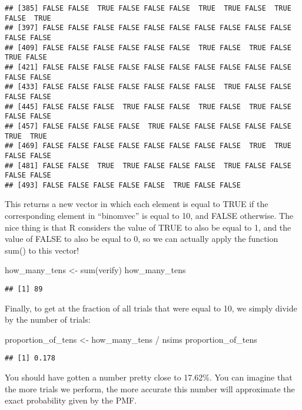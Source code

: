 \documentclass[
]{book}
\newenvironment{Shaded}{\begin{snugshade}}{\end{snugshade}}
\newcommand{\FunctionTok}[1]{\textcolor[rgb]{0.00,0.00,0.00}{#1}}
\newcommand{\NormalTok}[1]{#1}
\newcommand{\OtherTok}[1]{\textcolor[rgb]{0.56,0.35,0.01}{#1}}
\newcommand{\SpecialCharTok}[1]{\textcolor[rgb]{0.00,0.00,0.00}{#1}}
\begin{document}
\begin{verbatim}
## [385] FALSE FALSE  TRUE FALSE FALSE FALSE  TRUE  TRUE FALSE  TRUE FALSE  TRUE
## [397] FALSE FALSE FALSE FALSE FALSE FALSE FALSE FALSE FALSE FALSE FALSE FALSE
## [409] FALSE FALSE FALSE FALSE FALSE FALSE  TRUE FALSE  TRUE FALSE  TRUE FALSE
## [421] FALSE FALSE FALSE FALSE FALSE FALSE FALSE FALSE FALSE FALSE FALSE FALSE
## [433] FALSE FALSE FALSE FALSE FALSE FALSE FALSE  TRUE FALSE FALSE FALSE FALSE
## [445] FALSE FALSE FALSE  TRUE FALSE FALSE  TRUE FALSE  TRUE FALSE FALSE FALSE
## [457] FALSE FALSE FALSE FALSE  TRUE FALSE FALSE FALSE FALSE FALSE  TRUE  TRUE
## [469] FALSE FALSE FALSE FALSE FALSE FALSE FALSE FALSE  TRUE  TRUE FALSE FALSE
## [481] FALSE FALSE  TRUE  TRUE FALSE FALSE FALSE  TRUE FALSE FALSE FALSE FALSE
## [493] FALSE FALSE FALSE FALSE FALSE  TRUE FALSE FALSE
\end{verbatim}

This returns a new vector in which each element is equal to TRUE if the corresponding element in ``binomvec'' is equal to 10, and FALSE otherwise. The nice thing is that R considers the value of TRUE to also be equal to 1, and the value of FALSE to also be equal to 0, so we can actually apply the function sum() to this vector!

\begin{Shaded}
\begin{Highlighting}[]
\NormalTok{how\_many\_tens }\OtherTok{\textless{}{-}} \FunctionTok{sum}\NormalTok{(verify)}
\NormalTok{how\_many\_tens}
\end{Highlighting}
\end{Shaded}

\begin{verbatim}
## [1] 89
\end{verbatim}

Finally, to get at the fraction of all trials that were equal to 10, we simply divide by the number of trials:

\begin{Shaded}
\begin{Highlighting}[]
\NormalTok{proportion\_of\_tens }\OtherTok{\textless{}{-}}\NormalTok{ how\_many\_tens }\SpecialCharTok{/}\NormalTok{ nsims}
\NormalTok{proportion\_of\_tens}
\end{Highlighting}
\end{Shaded}

\begin{verbatim}
## [1] 0.178
\end{verbatim}

You should have gotten a number pretty close to 17.62\%. You can imagine that the more trials we perform, the more accurate this number will approximate the exact probability given by the PMF.
\end{document}
